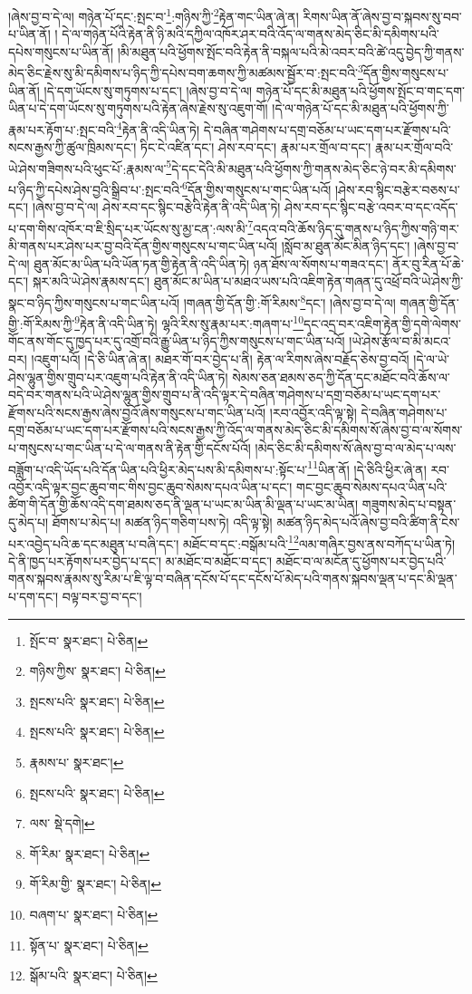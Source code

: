 །ཞེས་བྱ་བ་དེ་ལ། གཉེན་པོ་དང་:སྤང་བ་\footnote{སྤོང་བ་  སྣར་ཐང་།  པེ་ཅིན། }:གཉིས་ཀྱི་\footnote{གཉིས་ཀྱིས་  སྣར་ཐང་།  པེ་ཅིན། }རྟེན་གང་ཡིན་ཞེ་ན། རིགས་ཡིན་ནོ་ཞེས་བྱ་བ་སྐབས་སུ་བབ་པ་ཡིན་ནོ། །
དེ་ལ་གཉེན་པོའི་རྟེན་ནི་ཉི་མའི་དཀྱིལ་འཁོར་ཤར་བའི་འོད་ལ་གནས་མེད་ཅིང་མི་དམིགས་པའི་དཔེས་གསུངས་པ་ཡིན་ནོ། །མི་མཐུན་པའི་ཕྱོགས་སྤོང་བའི་རྟེན་ནི་བསྐལ་པའི་མེ་འབར་བའི་ཚེ་འདུ་བྱེད་ཀྱི་གནས་མེད་ཅིང་རྗེས་སུ་མི་དམིགས་པ་ཉིད་ཀྱི་དཔེས་བག་ཆགས་ཀྱི་མཚམས་སྦྱོར་བ་:སྤང་བའི་\footnote{སྤངས་པའི་  སྣར་ཐང་།  པེ་ཅིན། }དོན་གྱིས་གསུངས་པ་ཡིན་ནོ། །དེ་དག་ཡོངས་སུ་གཏུགས་པ་དང་། །ཞེས་བྱ་བ་དེ་ལ། གཉེན་པོ་དང་མི་མཐུན་པའི་ཕྱོགས་སྤོང་བ་གང་དག་ཡིན་པ་དེ་དག་ཡོངས་སུ་གཏུགས་པའི་རྟེན་ཞེས་རྗེས་སུ་འཇུག་གོ། །དེ་ལ་གཉེན་པོ་དང་མི་མཐུན་པའི་ཕྱོགས་ཀྱི་རྣམ་པར་རྟོག་པ་:སྤང་བའི་\footnote{སྤངས་པའི་  སྣར་ཐང་།  པེ་ཅིན། }རྟེན་ནི་འདི་ཡིན་ཏེ། དེ་བཞིན་གཤེགས་པ་དགྲ་བཅོམ་པ་ཡང་དག་པར་རྫོགས་པའི་སངས་རྒྱས་ཀྱི་ཚུལ་ཁྲིམས་དང་། ཏིང་ངེ་འཛིན་དང་། ཤེས་རབ་དང་། རྣམ་པར་གྲོལ་བ་དང་། རྣམ་པར་གྲོལ་བའི་ཡེ་ཤེས་གཟིགས་པའི་ཕུང་པོ་:རྣམས་ལ་\footnote{རྣམས་པ་  སྣར་ཐང་། }དེ་དང་དེའི་མི་མཐུན་པའི་ཕྱོགས་ཀྱི་གནས་མེད་ཅིང་ཉེ་བར་མི་དམིགས་པ་ཉིད་ཀྱི་དཔེས་ཤེས་བྱའི་སྒྲིབ་པ་:སྤང་བའི་\footnote{སྤངས་པའི་  སྣར་ཐང་།  པེ་ཅིན། }དོན་གྱིས་གསུངས་པ་གང་ཡིན་པའོ། །ཤེས་རབ་སྙིང་བརྩེར་བཅས་པ་དང་། །ཞེས་བྱ་བ་དེ་ལ། ཤེས་རབ་དང་སྙིང་བརྩེའི་རྟེན་ནི་འདི་ཡིན་ཏེ། ཤེས་རབ་དང་སྙིང་བརྩེ་འབར་བ་དང་འདོད་པ་དག་གིས་འཁོར་བ་ཇི་སྲིད་པར་ཡོངས་སུ་མྱ་ངན་:ལས་མི་\footnote{ལས་  སྡེ་དགེ། }འདའ་བའི་ཆོས་ཉིད་དུ་གནས་པ་ཉིད་ཀྱིས་གཉི་གར་མི་གནས་པར་ཤེས་པར་བྱ་བའི་དོན་གྱིས་གསུངས་པ་གང་ཡིན་པའོ། །སློབ་མ་ཐུན་མོང་མིན་ཉིད་དང་། །ཞེས་བྱ་བ་དེ་ལ། ཐུན་མོང་མ་ཡིན་པའི་ཡོན་ཏན་གྱི་རྟེན་ནི་འདི་ཡིན་ཏེ། ཉན་ཐོས་ལ་སོགས་པ་གཟའ་དང་། ནོར་བུ་རིན་པོ་ཆེ་དང་། སྐར་མའི་ཡེ་ཤེས་རྣམས་དང་། ཐུན་མོང་མ་ཡིན་པ་མཐའ་ཡས་པའི་འཇིག་རྟེན་གཞན་དུ་འཕྲོ་བའི་ཡེ་ཤེས་ཀྱི་སྣང་བ་ཉིད་ཀྱིས་གསུངས་པ་གང་ཡིན་པའོ། །གཞན་གྱི་དོན་གྱི་:གོ་རིམས་\footnote{གོ་རིམ་  སྣར་ཐང་།  པེ་ཅིན། }དང་། །ཞེས་བྱ་བ་དེ་ལ། གཞན་གྱི་དོན་གྱི་:གོ་རིམས་ཀྱི་\footnote{གོ་རིམ་གྱི་  སྣར་ཐང་།  པེ་ཅིན། }རྟེན་ནི་འདི་ཡིན་ཏེ། ལྷའི་རིས་སུ་རྣམ་པར་:གཞག་པ་\footnote{བཞག་པ་  སྣར་ཐང་།  པེ་ཅིན། }དང་འདྲ་བར་འཇིག་རྟེན་གྱི་དགེ་ལེགས་གོང་ནས་གོང་དུ་ཁྱད་པར་དུ་འགྲོ་བའི་རྒྱུ་ཡིན་པ་ཉིད་ཀྱིས་གསུངས་པ་གང་ཡིན་པའོ། །ཡེ་ཤེས་རྩོལ་བ་མི་མངའ་བར། །འཇུག་པའོ། །དེ་ཅི་ཡིན་ཞེ་ན། མཐར་གོ་བར་བྱེད་པ་ནི། རྟེན་ལ་རིགས་ཞེས་བརྗོད་ཅེས་བྱ་བའོ། །དེ་ལ་ཡེ་ཤེས་ལྷུན་གྱིས་གྲུབ་པར་འཇུག་པའི་རྟེན་ནི་འདི་ཡིན་ཏེ། སེམས་ཅན་ཐམས་ཅད་ཀྱི་དོན་དང་མཐོང་བའི་ཆོས་ལ་བདེ་བར་གནས་པའི་ཡེ་ཤེས་ལྷུན་གྱིས་གྲུབ་པ་ནི་འདི་ལྟར་དེ་བཞིན་གཤེགས་པ་དགྲ་བཅོམ་པ་ཡང་དག་པར་རྫོགས་པའི་སངས་རྒྱས་ཞེས་བྱའོ་ཞེས་གསུངས་པ་གང་ཡིན་པའོ། །རབ་འབྱོར་འདི་ལྟ་སྟེ། དེ་བཞིན་གཤེགས་པ་དགྲ་བཅོམ་པ་ཡང་དག་པར་རྫོགས་པའི་སངས་རྒྱས་ཀྱི་འོད་ལ་གནས་མེད་ཅིང་མི་དམིགས་སོ་ཞེས་བྱ་བ་ལ་སོགས་པ་གསུངས་པ་གང་ཡིན་པ་དེ་ལ་གནས་ནི་རྟེན་གྱི་དངོས་པོའོ། །མེད་ཅིང་མི་དམིགས་སོ་ཞེས་བྱ་བ་ལ་མེད་པ་ལས་བཟློག་པ་འདི་ཡོད་པའི་དོན་ཡིན་པའི་ཕྱིར་མེད་པས་མི་དམིགས་པ་:སྟོང་པ་\footnote{སྟོན་པ་  སྣར་ཐང་།  པེ་ཅིན། }ཡིན་ནོ། །དེ་ཅིའི་ཕྱིར་ཞེ་ན། རབ་འབྱོར་འདི་ལྟར་བྱང་ཆུབ་གང་གིས་བྱང་ཆུབ་སེམས་དཔའ་ཡིན་པ་དང་། གང་བྱང་ཆུབ་སེམས་དཔའ་ཡིན་པའི་ཚིག་གི་དོན་གྱི་ཆོས་འདི་དག་ཐམས་ཅད་ནི་ལྡན་པ་ཡང་མ་ཡིན་མི་ལྡན་པ་ཡང་མ་ཡིན། གཟུགས་མེད་པ་བསྟན་དུ་མེད་པ། ཐོགས་པ་མེད་པ། མཚན་ཉིད་གཅིག་པས་ཏེ། འདི་ལྟ་སྟེ། མཚན་ཉིད་མེད་པའོ་ཞེས་བྱ་བའི་ཚིག་ནི་ངེས་པར་འབྱེད་པའི་ཆ་དང་མཐུན་པ་བཞི་དང་། མཐོང་བ་དང་:བསྒོམ་པའི་\footnote{སྒོམ་པའི་  སྣར་ཐང་།  པེ་ཅིན། }ལམ་གཞིར་བྱས་ནས་བཀོད་པ་ཡིན་ཏེ། དེ་ནི་ཁྱད་པར་རྟོགས་པར་བྱེད་པ་དང་། མ་མཐོང་བ་མཐོང་བ་དང་། མཐོང་བ་ལ་མངོན་དུ་ཕྱོགས་པར་བྱེད་པའི་གནས་སྐབས་རྣམས་སུ་རིམ་པ་ཇི་ལྟ་བ་བཞིན་དངོས་པོ་དང་དངོས་པོ་མེད་པའི་གནས་སྐབས་ལྡན་པ་དང་མི་ལྡན་པ་དག་དང་། བལྟ་བར་བྱ་བ་དང་། 